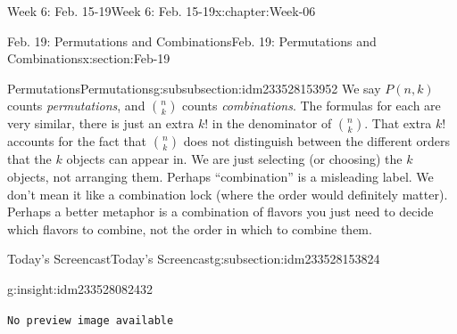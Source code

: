 \documentclass[oneside,10pt,]{book}
\newcommand{\mono}[1]{\texttt{#1}}
\numberwithin{equation}{section}
\newlength{\qrsize}
\newlength{\previewwidth}
\begin{document}
\begin{chapterptx}{Week 6: Feb. 15-19}{}{Week 6: Feb. 15-19}{}{}{x:chapter:Week-06}
\begin{sectionptx}{Feb. 19: Permutations and Combinations}{}{Feb. 19: Permutations and Combinations}{}{}{x:section:Feb-19}
\begin{subsubsectionptx}{Permutations}{}{Permutations}{}{}{g:subsubsection:idm233528153952}
 We say \(P(n,k)\) counts \emph{permutations}, and \({n \choose k}\) counts \emph{combinations}. The formulas for each are very similar, there is just an extra \(k!\) in the denominator of \({n \choose k}\). That extra \(k!\) accounts for the fact that \({n \choose k}\) does not distinguish between the different orders that the \(k\) objects can appear in. We are just selecting (or choosing) the \(k\) objects, not arranging them. Perhaps ``combination'' is a misleading label. We don't mean it like a combination lock (where the order would definitely matter). Perhaps a better metaphor is a combination of flavors \textemdash{} you just need to decide which flavors to combine, not the order in which to combine them.%
\end{subsubsectionptx}
%
%
\typeout{************************************************}
\typeout{************************************************}
%
\begin{subsectionptx}{Today's Screencast}{}{Today's Screencast}{}{}{g:subsection:idm233528153824}
\begin{insight}{}{g:insight:idm233528082432}%
\setlength{\qrsize}{9em}
\setlength{\previewwidth}{\linewidth}
\addtolength{\previewwidth}{-\qrsize}
\begin{tcbraster}[raster columns=2, raster column skip=1pt, raster halign=center, raster force size=false, raster left skip=0pt, raster right skip=0pt]%
\begin{tcolorbox}[previewstyle, width=\previewwidth]%
\mono{No preview image available}%
\end{tcolorbox}%
\begin{tcolorbox}[qrstyle]%
[QR LINK]\end{tcolorbox}%
\end{tcbraster}%
\end{insight}
\end{subsectionptx}
\end{sectionptx}
\end{chapterptx}
%
%
\typeout{************************************************}
\typeout{************************************************}
%
\end{document}
